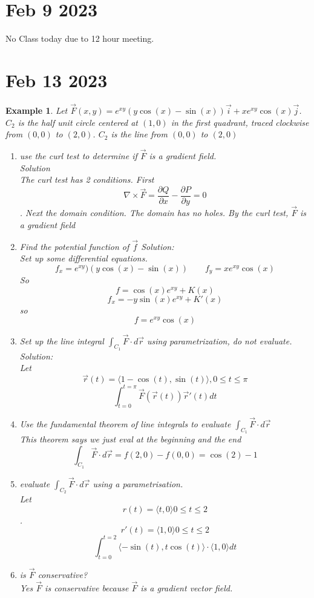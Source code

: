 \documentclass[11pt]{article}
\newtheorem{ex}{Example}
\begin{document}
\section{Feb 9 2023}
No Class today due to 12 hour meeting.
\section{Feb 13 2023}
\begin{ex}
  Let $\vec{F}(x,y) = e^{xy}(y\cos(x) - \sin(x))\vec{i} + xe^{xy}\cos(x) \vec{j}$. $C_{2}$ is the half unit circle centered at $(1,0)$
  in the first quadrant, traced clockwise from $(0,0)$ to $(2,0)$. $C_{2}$ is the line from $(0,0)$ to $(2,0)$
  \begin{enumerate}
    \item use the curl test to determine if $\vec{F}$ is a gradient field. \\
          Solution \\
          The curl test has 2 conditions. First
          \[\nabla \times \vec{F} = \frac{\partial Q}{\partial x} - \frac{\partial P}{\partial y} = 0\].
          Next the domain condition.
          The domain has no holes.
          By the curl test, $\vec{F}$ is a gradient field
    \item Find the potential function of $\vec{f}$
          Solution: \\
          Set up some differential equations.
          \[f_{x} = e^{xy})(y\cos(x) - \sin(x)) \qquad f_{y} = xe^{xy}\cos(x)\]
          So
          \[f = \cos(x) e^{xy} + K(x) \]
          \[f_{x} = -y\sin(x)e^{xy} + K'(x)\]
          so
          \[f = e^{xy}\cos(x)\]
    \item Set up the line integral $\int_{C_{1}} \vec{F} \cdot d \vec{r}$ using
          parametrization, do not evaluate. \\
          Solution: \\
          Let
          \[\vec{r}(t) = \langle 1 -\cos(t), \sin(t)  \rangle, 0 \le t \le \pi\]
          \[\int_{t=0}^{t=\pi} \vec{F}(\vec{r}(t)) \vec{r}'(t) dt\]
    \item Use the fundamental theorem of line integrals to evaluate $\int_{C_{1}} \vec{F} \cdot d\vec{r}$\\
          This theorem says we just eval at the beginning and the end
          \[\int_{C_{1}} \vec{F} \cdot d \vec{r} = f(2,0) - f(0,0) = \cos(2) - 1\]
    \item evaluate $\int_{C_{2}} \vec{F} \cdot d\vec{r}$ using a parametrisation.\\
          Let
          \[r(t) = \langle t, 0 \rangle 0 \le t \le 2\].
          \[r'(t) = \langle 1, 0 \rangle 0 \le t \le 2\]
          \[\int_{t=0}^{t=2} \langle -\sin(t),t\cos(t) \rangle \cdot \langle 1, 0\rangle dt\]
    \item is $\vec{F}$ conservative? \\
          Yes $\vec{F}$ is conservative because $\vec{F}$ is a gradient vector field.
    \end{enumerate}
  \end{ex}
\end{document}
